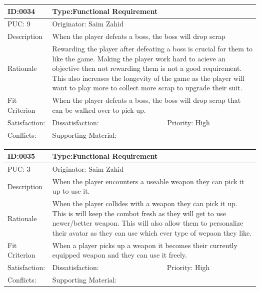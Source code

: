\documentclass{article}
\begin{document}
	\begin{table}[H]
		\begin{tabular}{|l|l|l|}
			\hline
			ID:0034 & \multicolumn{2}{l|}{Type:Functional Requirement} \\ \hline
			PUC: 9 & \multicolumn{2}{l|}{Originator: Saim Zahid} \\ \hline
			Description & \multicolumn{2}{m{0.85\textwidth}|}{When the player defeats a boss, the boss will drop scrap} \\ \hline
			Rationale & \multicolumn{2}{m{0.85\textwidth}|}{Rewarding the player after defeating a boss is crucial for them to like the game. Making the player work hard to acieve an objective then not rewarding them is not a good requirement. This also increases the longevity of the game as the player will want to play more to collect more scrap to upgrade their suit.} \\ \hline
			Fit Criterion & \multicolumn{2}{m{0.85\textwidth}|}{When the player defeats a boss, the boss will drop scrap that can be walked over to pick up.} \\ \hline
			Satisfaction: & Dissatisfaction: & Priority: High\\ \hline
			Conflicts: & \multicolumn{2}{l|}{Supporting Material:} \\ \hline
		\end{tabular}
	\end{table}

	\begin{table}[H]
		\begin{tabular}{|l|l|l|}
			\hline
			ID:0035 & \multicolumn{2}{l|}{Type:Functional Requirement} \\ \hline
			PUC: 3 & \multicolumn{2}{l|}{Originator: Saim Zahid} \\ \hline
			Description & \multicolumn{2}{m{0.85\textwidth}|}{When the player encounters a useable weapon they can pick it up to use it.} \\ \hline
			Rationale & \multicolumn{2}{m{0.85\textwidth}|}{When the player collides with a weapon they can pick it up. This is will keep the combot fresh as they will get to use newer/better weapon. This will also allow them to personalize their avatar as they can use which ever type of wepaon they like.} \\ \hline
			Fit Criterion & \multicolumn{2}{m{0.85\textwidth}|}{When a player picks up a weapon it becomes their currently equipped weapon and they can use it freely.} \\ \hline
			Satisfaction: & Dissatisfaction: & Priority: High\\ \hline
			Conflicts: & \multicolumn{2}{l|}{Supporting Material:} \\ \hline
		\end{tabular}
	\end{table}
\end{document}
